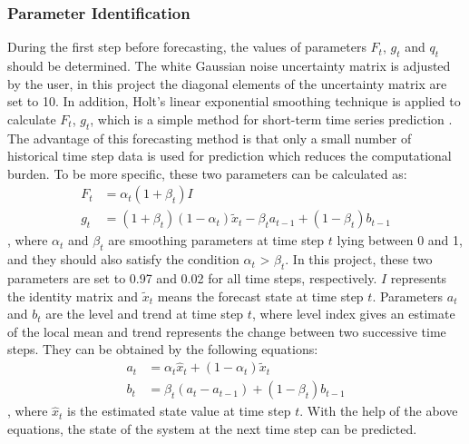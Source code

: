 \subsubsection{Parameter Identification}
During the first step before forecasting, the values of parameters $F_t$, $g_t$ and $q_t$ should be determined. The white Gaussian noise uncertainty matrix is adjusted by the user, in this project the diagonal elements of the uncertainty matrix are set to 10. In addition, Holt's linear exponential smoothing technique is applied to calculate $F_t$, $g_t$, which is a simple method for short-term time series prediction \cite{da1983state}. The advantage of this forecasting method is that only a small number of historical time step data is used for prediction which reduces the computational burden. To be more specific, these two parameters can be calculated as:
\begin{align}
    F_t &= \alpha_t (1+ \beta_t) I 
    \label{eq:quasi-transition matrix}\\[1pt]
    g_t &= (1+\beta_t)(1-\alpha_t)\widetilde{x}_t-\beta_t a_{t-1} + (1-\beta_t)b_{t-1}
    \label{eq:behaviour_trend matrix}
\end{align}
, where $\alpha_t$ and $\beta_t$ are smoothing parameters at time step $t$ lying between 0 and 1, and they should also satisfy the condition $\alpha_t$ > $\beta_t$. In this project, these two parameters are set to 0.97 and 0.02 for all time steps, respectively. $I$ represents the identity matrix and $\widetilde{x}_t$ means the forecast state at time step $t$. Parameters $a_t$ and $b_t$ are the level and trend at time step $t$, where level index gives an estimate of the local mean and trend represents the change between two successive time steps. They can be obtained by the following equations:
\begin{align}
    a_t &= \alpha_t \hat{x}_t + (1-\alpha_t) \widetilde{x}_t 
    \label{eq:EKF_parameter_a}\\[1pt]
    b_t &= \beta_t (a_t - a_{t-1})+(1-\beta_t)b_{t-1}
    \label{eq:EKF_parameter_b}
\end{align}
, where $\hat{x}_t$ is the estimated state value at time step $t$. With the help of the above equations, the state of the system at the next time step can be predicted.

